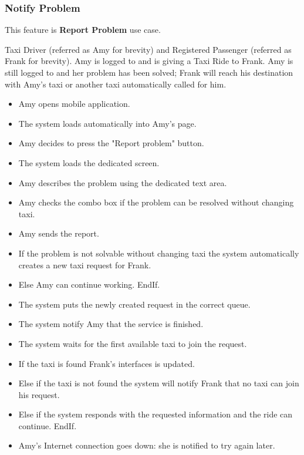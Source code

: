 \subsubsection{Notify Problem}
This feature is \textbf{Report Problem} use case.
\begin{itemize}
	 Taxi Driver (referred as Amy for brevity) and Registered Passenger (referred as Frank for brevity).
	 Amy is logged to \myTaxiService{} and is giving a Taxi Ride to Frank.
	 Amy is still logged to \myTaxiService{} and her problem has been solved; Frank will reach his destination with Amy's taxi or another taxi automatically called for him.
	\begin{itemize}
		\item Amy opens \myTaxiService{} mobile application.
		\item The system loads automatically into Amy's page.
		\item Amy decides to press the "Report problem" button.
		\item The system loads the dedicated screen.
		\item Amy describes the problem using the dedicated text area.
		\item Amy checks the combo box if the problem can be resolved without changing taxi.
		\item Amy sends the report.
		\item If the problem is not solvable without changing taxi the system automatically creates a new taxi request for Frank.
		\item Else Amy can continue working. EndIf.
		\item The system puts the newly created request in the correct queue.
		\item The system notify Amy that the service is finished.
		\item The system waits for the first available taxi to join the request.
		\item If the taxi is found Frank's interfaces is updated.
		\item Else if the taxi is not found the system will notify Frank that no taxi can join his request.
		\item Else if the system responds with the requested information and the ride can continue. EndIf.
	\end{itemize}
	\begin{itemize}
		\item Amy's Internet connection goes down: she is notified to try again later.
	\end{itemize}
\end{itemize}
